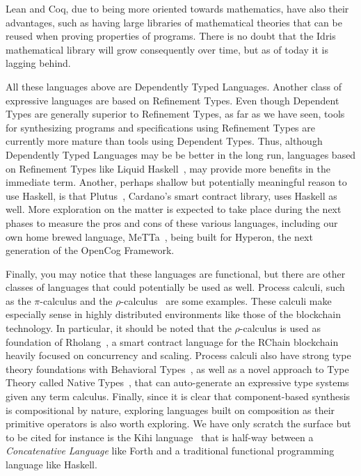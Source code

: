 \documentclass[]{report}
\begin{document}
Lean and Coq, due to being more oriented towards mathematics, have
also their advantages, such as having large libraries of mathematical
theories that can be reused when proving properties of programs.
There is no doubt that the Idris mathematical library will grow
consequently over time, but as of today it is lagging behind.

All these languages above are Dependently Typed Languages.  Another
class of expressive languages are based on Refinement Types.  Even
though Dependent Types are generally superior to Refinement Types, as
far as we have seen, tools for synthesizing programs and
specifications using Refinement Types are currently more mature than
tools using Dependent Types.  Thus, although Dependently Typed
Languages may be be better in the long run, languages based on
Refinement Types like Liquid Haskell~\cite{Vazou2014}, may provide
more benefits in the immediate term.  Another, perhaps shallow but
potentially meaningful reason to use Haskell, is that
Plutus~\cite{Plutus2022}, Cardano's smart contract library, uses
Haskell as well.  More exploration on the matter is expected to take
place during the next phases to measure the pros and cons of these
various languages, including our own home brewed language,
MeTTa~\cite{Warrell2022}, being built for Hyperon, the next generation
of the OpenCog Framework.

Finally, you may notice that these languages are functional, but there
are other classes of languages that could potentially be used as well.
Process calculi, such as the $\pi$-calculus and the
$\rho$-calculus~\cite{Meredith2005} are some examples.  These calculi
make especially sense in highly distributed environments like those of
the blockchain technology.  In particular, it should be noted that the
$\rho$-calculus is used as foundation of Rholang~\cite{Rholang2021}, a
smart contract language for the RChain blockchain~\cite{RChain2021}
heavily focused on concurrency and scaling.  Process calculi also have
strong type theory foundations with Behavioral
Types~\cite{Caires2004}, as well as a novel approach to Type Theory
called Native Types~\cite{Williams2021}, that can auto-generate an
expressive type systems given any term calculus.  Finally, since it is
clear that component-based synthesis is compositional by nature,
exploring languages built on composition as their primitive operators
is also worth exploring.  We have only scratch the surface but to be
cited for instance is the Kihi language~\cite{Timothy2018} that is
half-way between a \emph{Concatenative Language} like Forth and a
traditional functional programming language like Haskell.
\end{document}
